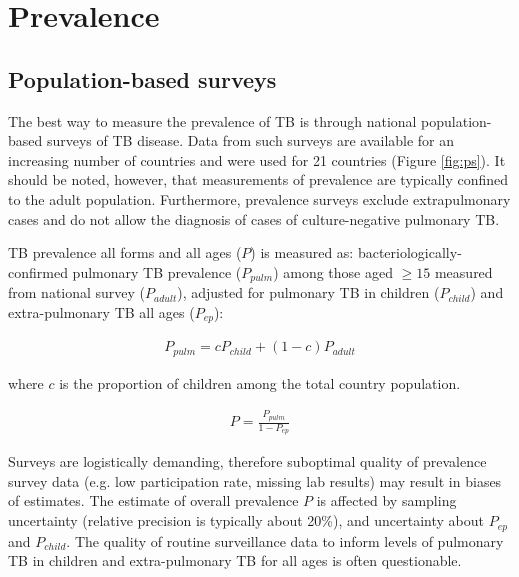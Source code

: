 \section{Prevalence}

\subsection{Population-based surveys}
The best way to measure the prevalence of TB is through national population-based surveys of TB disease\cite{18713496}\cite{WHO2011}. Data from such surveys are available for an increasing number of countries and were used for 21 countries (Figure \ref{fig:ps}). It should be noted, however, that measurements of prevalence are typically confined to the adult population. Furthermore, prevalence surveys exclude extrapulmonary cases and do not allow the diagnosis of cases of culture-negative pulmonary TB. 

TB prevalence all forms and all ages ($P$) is measured as:  bacteriologically-confirmed pulmonary TB prevalence ($P_{pulm}$) among those aged $\geq 15$ measured from national survey ($P_{adult}$), adjusted for pulmonary TB in children ($P_{child}$) and extra-pulmonary TB all ages ($P_{ep}$):

\begin{align*}
P_{pulm} = c P_{child} + (1 − c) P_{adult}
\end{align*}

where $c$ is the proportion of children among the total country population.

\begin{align*}
P = \frac{P_{pulm}}{1 - P_{ep}}
\end{align*}

Surveys are logistically demanding, therefore suboptimal quality of prevalence survey data (e.g. low participation rate, missing lab results) may result in biases of estimates. The estimate of overall prevalence $P$ is affected by sampling uncertainty (relative precision is typically about 20\%), and uncertainty about $P_{ep}$ and $P_{child}$. The  quality of routine surveillance data to inform levels of pulmonary TB in children and extra-pulmonary TB for all ages is often questionable.



 